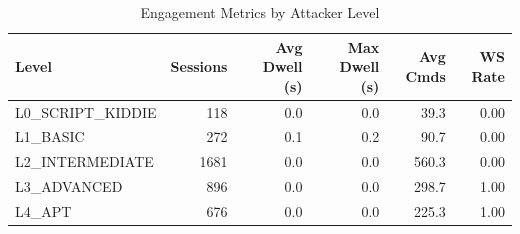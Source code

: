 \begin{table}[t]
\centering
\caption{Engagement Metrics by Attacker Level}
\label{tab:engagement}
\begin{tabular}{lrrrrr}
\toprule
Level & Sessions & Avg Dwell (s) & Max Dwell (s) & Avg Cmds & WS Rate \\
\midrule
L0_SCRIPT_KIDDIE & 118 & 0.0 & 0.0 & 39.3 & 0.00 \\
L1_BASIC & 272 & 0.1 & 0.2 & 90.7 & 0.00 \\
L2_INTERMEDIATE & 1681 & 0.0 & 0.0 & 560.3 & 0.00 \\
L3_ADVANCED & 896 & 0.0 & 0.0 & 298.7 & 1.00 \\
L4_APT & 676 & 0.0 & 0.0 & 225.3 & 1.00 \\
\bottomrule
\end{tabular}
\end{table}